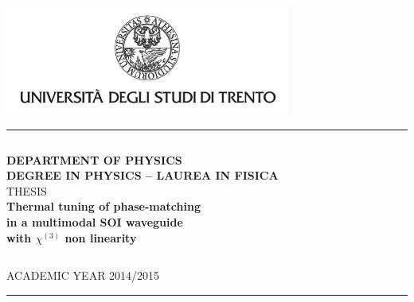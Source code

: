 \documentclass[11pt,a4paper]{article}
\begin{document}
\begin{titlepage}
\begin{center}

\includegraphics[width=0.7\textwidth]{unitn_logo.png}~\\[1.2cm]

\hrule
$$$$
$$$$

\textsc{\LARGE \textbf{DEPARTMENT OF PHYSICS}}\\[0.5cm]
\textsc{\LARGE \textbf{DEGREE IN PHYSICS – LAUREA IN FISICA}}\\[2.5cm]
\textsc{\Large THESIS}\\[1.3cm]

{ \huge \bfseries Thermal tuning of phase-matching}\\
[0.5cm]
{ \huge \bfseries in a multimodal SOI waveguide}\\
[0.5cm]
{ \huge \bfseries with $\chi^{(3)}$ non linearity}\\
[3.0cm]

\begin{parcolumns}{2}
\end{parcolumns}
$$$$
$$$$
$$$$
$$$$
$$$$
$$$$
$$$$
$$$$

\large ACADEMIC YEAR 2014/2015
\hrule
\vfill

\vfill

{\large}

\end{center}
\end{titlepage}
\end{document}
